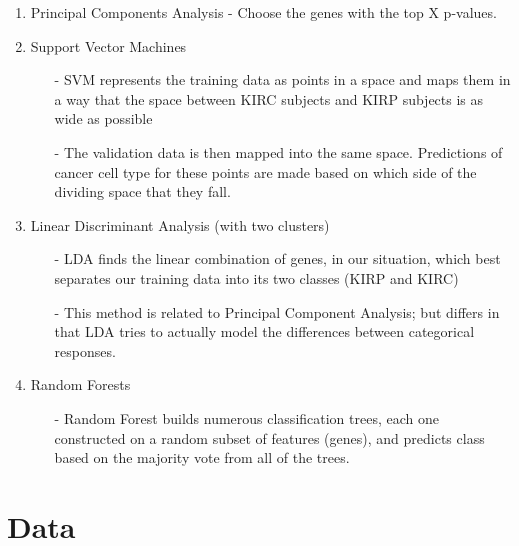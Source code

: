 \begin{enumerate}
\item Principal Components Analysis - Choose the genes with the top X p-values. 
\item Support Vector Machines
\begin{itemize}
\item[-] SVM represents the training data as points in a space and maps them in a way
that the space between KIRC subjects and KIRP subjects is as wide as possible
\item[-] The validation data is then mapped into the same space. Predictions of cancer
cell type for these points are made based on which side of the dividing space that they fall. 
\end{itemize}
\item Linear Discriminant Analysis (with two clusters)
\begin{itemize}
\item[-] LDA finds the linear combination of genes, in our situation, which best separates our
training data into its two classes (KIRP and KIRC)
\item[-] This method is related to Principal Component Analysis; but differs in that LDA tries to
actually model the differences between categorical responses.
\end{itemize}
\item Random Forests
\begin{itemize}
\item[-] Random Forest builds numerous classification trees, each one constructed on a random subset of
features (genes), and predicts class based on the majority vote from all of the trees.
\end{itemize}
\end{enumerate}

%

\section{Data}

